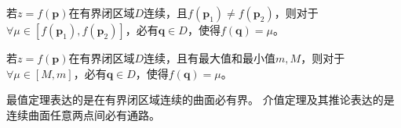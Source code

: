 \begin{theorem}[介值定理]
若$z=f\left( \boldsymbol{p} \right) $在有界闭区域$D$连续，且$f\left( \boldsymbol{p}_1 \right) \ne f\left( \boldsymbol{p}_2 \right) $，则对于$\forall \mu \in \left[ f\left( \boldsymbol{p}_1 \right) ,f\left( \boldsymbol{p}_2 \right) \right] $，必有$\boldsymbol{q}\in D$，使得$f\left( \boldsymbol{q} \right) =\mu $。
\end{theorem}

\begin{corollary}
若$z=f\left( \boldsymbol{p} \right) $在有界闭区域$D$连续，且有最大值和最小值$m,M$，则对于$\forall \mu \in \left[ M,m \right] $，必有$\boldsymbol{q}\in D$，使得$f\left( \boldsymbol{q} \right) =\mu $。
\end{corollary}

最值定理表达的是在有界闭区域连续的曲面必有界。
介值定理及其推论表达的是连续曲面任意两点间必有通路。




